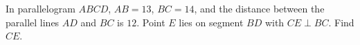 In parallelogram $ABCD$, $AB=13$, $BC=14$, and the distance between the parallel lines $AD$ and $BC$ is $12$. Point $E$ lies on segment $BD$ with $CE\perp BC$. Find $CE$.
